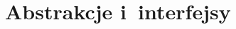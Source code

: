 \documentclass[10pt,t]{beamer}
\begin{document}















\section{Abstrakcje i~interfejsy}
\end{document}
